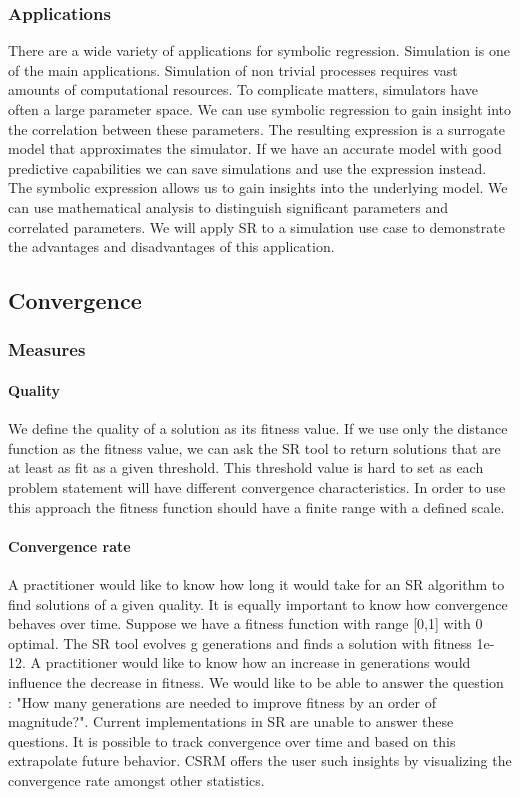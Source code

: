 \subsubsection{Applications}
There are a wide variety of applications for symbolic regression. Simulation is one of the main applications. Simulation of non trivial processes requires vast amounts of computational resources. To complicate matters, simulators have often a large parameter space.
We can use symbolic regression to gain insight into the correlation between these parameters. The resulting expression is a surrogate model that approximates the simulator. If we have an accurate model with good predictive capabilities we can save simulations and use the expression instead. The symbolic expression allows us to gain insights into the underlying model. We can use mathematical analysis to distinguish significant parameters and correlated parameters. We will apply SR to a simulation use case to demonstrate the advantages and disadvantages of this application.

\subsection{Convergence}
\subsubsection{Measures}
\paragraph{Quality}
We define the quality of a solution as its fitness value. If we use only the distance function as the fitness value, we can ask the SR tool to return solutions that are at least as fit as a given threshold. This threshold value is hard to set as each problem statement will have different convergence characteristics. In order to use this approach the fitness function should have a finite range with a defined scale. 
\paragraph{Convergence rate}
A practitioner would like to know how long it would take for an SR algorithm to find solutions of a given quality. It is equally important to know how convergence behaves over time. Suppose we have a fitness function with range [0,1] with 0 optimal. The SR tool evolves g generations and finds a solution with fitness 1e-12. A practitioner would like to know how an increase in generations would influence the decrease in fitness. We would like to be able to answer the question : "How many generations are needed to improve fitness by an order of magnitude?". Current implementations in SR are unable to answer these questions. It is possible to track convergence over time and based on this extrapolate future behavior. CSRM offers the user such insights by visualizing the convergence rate amongst other statistics.

